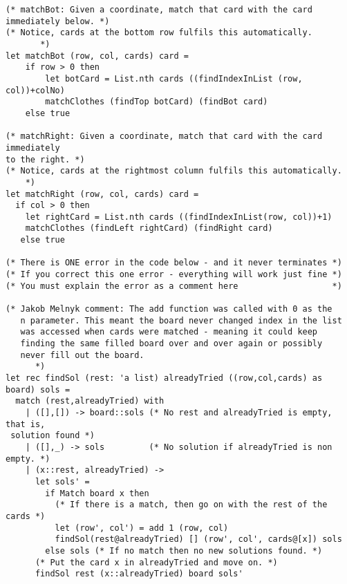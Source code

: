 \begin{lstlisting}
(* matchBot: Given a coordinate, match that card with the card 
immediately below. *)
(* Notice, cards at the bottom row fulfils this automatically.             
       *)
let matchBot (row, col, cards) card = 
    if row > 0 then
        let botCard = List.nth cards ((findIndexInList (row, col))+colNo)
        matchClothes (findTop botCard) (findBot card)
    else true

(* matchRight: Given a coordinate, match that card with the card immediately 
to the right. *)
(* Notice, cards at the rightmost column fulfils this automatically.                   
    *)
let matchRight (row, col, cards) card = 
  if col > 0 then
    let rightCard = List.nth cards ((findIndexInList(row, col))+1)
    matchClothes (findLeft rightCard) (findRight card)
   else true

(* There is ONE error in the code below - and it never terminates *)
(* If you correct this one error - everything will work just fine *)
(* You must explain the error as a comment here                   *)

(* Jakob Melnyk comment: The add function was called with 0 as the
   n parameter. This meant the board never changed index in the list
   was accessed when cards were matched - meaning it could keep
   finding the same filled board over and over again or possibly
   never fill out the board.								
	  *)
let rec findSol (rest: 'a list) alreadyTried ((row,col,cards) as board) sols =
  match (rest,alreadyTried) with
    | ([],[]) -> board::sols (* No rest and alreadyTried is empty, that is,
 solution found *)
    | ([],_) -> sols         (* No solution if alreadyTried is non empty. *)
    | (x::rest, alreadyTried) ->
      let sols' = 
        if Match board x then
          (* If there is a match, then go on with the rest of the cards *)
          let (row', col') = add 1 (row, col)
          findSol(rest@alreadyTried) [] (row', col', cards@[x]) sols
        else sols (* If no match then no new solutions found. *)
      (* Put the card x in alreadyTried and move on. *)
      findSol rest (x::alreadyTried) board sols'
\end{lstlisting}